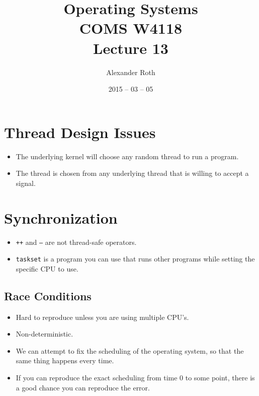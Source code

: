 \documentclass[]{article}
\begin{document}
\newcommand{\code}{\texttt}
\newtheorem{thm}{Theorem}
\title{Operating Systems \\ COMS W4118 \\ Lecture 13}
\author{Alexander Roth}
\date{2015 -- 03 -- 05}
\maketitle

\section{Thread Design Issues}
\begin{itemize}
\item The underlying kernel will choose any random thread to run a program.
\item The thread is chosen from any underlying thread that is willing to accept
a signal.
\end{itemize}

\section{Synchronization}
\begin{itemize}
\item \code{++} and \code{--} are not thread-safe operators.
\item \code{taskset} is a program you can use that runs other programs while
setting the specific CPU to use.
\end{itemize}

\subsection{Race Conditions}
\begin{itemize}
\item Hard to reproduce unless you are using multiple CPU's.
\item Non-deterministic.
\item We can attempt to fix the scheduling of the operating system, so that the
same thing happens every time.
\item If you can reproduce the exact scheduling from time 0 to some point, there
is a good chance you can reproduce the error.
\end{itemize}
\end{document}
